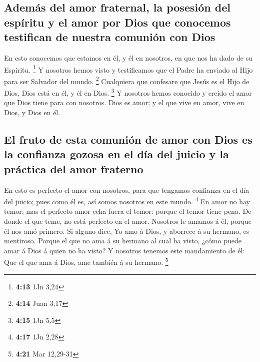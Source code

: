 \hypertarget{ademuxe1s-del-amor-fraternal-la-posesiuxf3n-del-espuxedritu-y-el-amor-por-dios-que-conocemos-testifican-de-nuestra-comuniuxf3n-con-dios}{%
\subsection{Además del amor fraternal, la posesión del espíritu y el
amor por Dios que conocemos testifican de nuestra comunión con
Dios}\label{ademuxe1s-del-amor-fraternal-la-posesiuxf3n-del-espuxedritu-y-el-amor-por-dios-que-conocemos-testifican-de-nuestra-comuniuxf3n-con-dios}}

 En esto conocemos que estamos en él, y él en nosotros, en
que nos ha dado de su Espíritu. \footnote{\textbf{4:13} 1Jn 3,24}
 Y nosotros hemos visto y testificamos que el Padre ha
enviado al Hijo para ser Salvador del mundo. \footnote{\textbf{4:14}
  Juan 3,17}  Cualquiera que confesare que Jesús es el Hijo
de Dios, Dios está en él, y él en Dios. \footnote{\textbf{4:15} 1Jn 5,5}
 Y nosotros hemos conocido y creído el amor que Dios tiene
para con nosotros. Dios es amor; y el que vive en amor, vive en Dios, y
Dios en él.

\hypertarget{el-fruto-de-esta-comuniuxf3n-de-amor-con-dios-es-la-confianza-gozosa-en-el-duxeda-del-juicio-y-la-pruxe1ctica-del-amor-fraterno}{%
\subsection{El fruto de esta comunión de amor con Dios es la confianza
gozosa en el día del juicio y la práctica del amor
fraterno}\label{el-fruto-de-esta-comuniuxf3n-de-amor-con-dios-es-la-confianza-gozosa-en-el-duxeda-del-juicio-y-la-pruxe1ctica-del-amor-fraterno}}

 En esto es perfecto el amor con nosotros, para que
tengamos confianza en el día del juicio; pues como él es, así somos
nosotros en este mundo. \footnote{\textbf{4:17} 1Jn 2,28} 
En amor no hay temor; mas el perfecto amor echa fuera el temor: porque
el temor tiene pena. De donde el que teme, no está perfecto en el amor.
 Nosotros le amamos á él, porque él nos amó primero.
 Si alguno dice, Yo amo á Dios, y aborrece á su hermano, es
mentiroso. Porque el que no ama á su hermano al cual ha visto, ¿cómo
puede amar á Dios á quien no ha visto?  Y nosotros tenemos
este mandamiento de él: Que el que ama á Dios, ame también á su hermano.
\footnote{\textbf{4:21} Mar 12,29-31}

